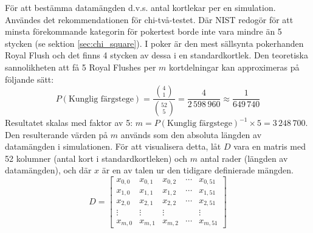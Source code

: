\documentclass[swedish,a4paper]{article}
\begin{document}
För att bestämma datamängden d.v.s. antal kortlekar per en simulation. Användes
det rekommendationen för chi-två-testet. Där NIST redogör för att minsta förekommande
kategorin för pokertest borde inte vara mindre än 5 stycken (se sektion
\ref{sec:chi_square}). 
I poker är den mest
sällsynta pokerhanden Royal Flush och det finns 4
stycken av dessa i en standardkortlek. Den teoretiska sannolikheten att
få 5 Royal Flushes per $m$ kortdelningar kan approximeras på följande sätt: 
$$ P(\text{Kunglig färgstege}) =  \frac{\binom{4}{1}}{\binom{52}{5}} =
\frac{4}{2\,598\,960} \approx \frac{1}{649\,740} $$ 
Resultatet skalas med faktor av 5:
$m = P(\text{Kunglig färgstege})^{-1}  \times 5 = 3\,248\,700$.
Den resulterande värden på $m$ används som den absoluta längden av datamängden i
simulationen. För att visualisera detta, låt $D$ vara en \gls{matris} 
med 52 kolumner (antal kort i standardkortleken) och $m$ antal rader (längden av
datamängden), och där $x$ är en av talen ur den tidigare definierade mängden.
\begin{equation*}
	D = \begin{bmatrix}
		x_{0,0} & x_{0,1} & x_{0,2} & \cdots & x_{0,51}\\ 
		x_{1,0} & x_{1,1} & x_{1,2} & \cdots & x_{1,51}\\
		x_{2,0} & x_{2,1} & x_{2,2} & \cdots & x_{2,51}\\
		\vdots & \vdots & \vdots & \; & \vdots \\
		x_{m,0} & x_{m,1} & x_{m,2} & \cdots & x_{m,51}
	\end{bmatrix}
\end{equation*}
\end{document}
